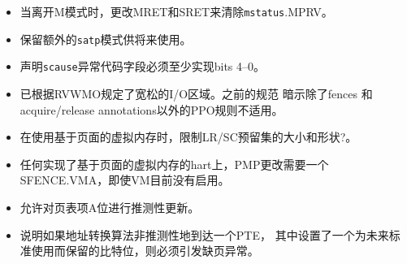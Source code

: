\vspace{-0.2in}
\begin{itemize}
  \parskip 0pt
  \itemsep 1pt
\iffalse
\item Changed MRET and SRET to clear {\tt mstatus}.MPRV when leaving M-mode.
\item Reserved additional {\tt satp} patterns for future use.
\item Stated that the {\tt scause} Exception Code field must implement
  bits 4--0 at minimum.
\item Relaxed I/O regions have been specified to follow RVWMO.  The previous
  specification implied that PPO rules other than fences and acquire/release
  annotations did not apply.
\item Constrained the LR/SC reservation set size and shape when using
  page-based virtual memory.
\item PMP changes require an SFENCE.VMA on any hart that implements
  page-based virtual memory, even if VM is not currently enabled.
\item Allowed for speculative updates of page table entry A bits.
\item Clarify that if the address-translation algorithm non-speculatively
  reaches a PTE in which a bit reserved for future standard use is set,
  a page-fault exception must be raised.
\fi
\item 当离开M模式时，更改MRET和SRET来清除{\tt mstatus}.MPRV。
\item 保留额外的{\tt satp}模式供将来使用。
\item 声明{\tt scause}异常代码字段必须至少实现bits 4--0。
\item 已根据RVWMO规定了宽松的I/O区域。之前的规范
      暗示除了fences 和 acquire/release annotations以外的PPO规则不适用。
\item 在使用基于页面的虚拟内存时，限制LR/SC预留集的大小和形状?。
\item 任何实现了基于页面的虚拟内存的hart上，PMP更改需要一个SFENCE.VMA，即使VM目前没有启用。
\item 允许对页表项A位进行推测性更新。
\item 说明如果地址转换算法非推测性地到达一个PTE，
      其中设置了一个为未来标准使用而保留的比特位，则必须引发缺页异常。
\end{itemize}

